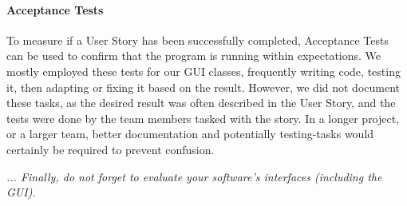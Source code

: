 \paragraph{Acceptance Tests}
To measure if a User Story has been successfully completed, Acceptance Tests can be used to confirm that the program is running within expectations. 
We mostly employed these tests for our GUI classes, frequently writing code, testing it, then adapting or fixing it based on the result. 
However, we did not document these tasks, as the desired result was often described in the User Story, and the tests were done by the team members tasked with the story. In a longer project, or a larger team, better documentation and potentially testing-tasks would certainly be required to prevent confusion.

\emph{... Finally, do not forget to evaluate your software's interfaces (including the GUI).}


